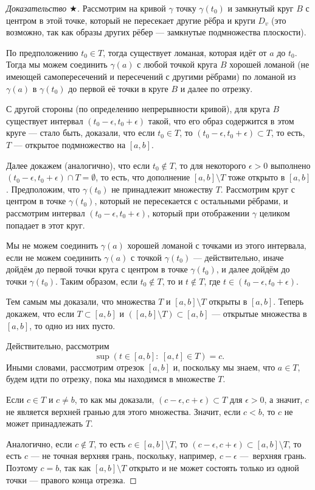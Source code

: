 \begin{proof}[Доказательство $\bigstar$]
    Рассмотрим на кривой $\gamma$ точку $\gamma(t_0)$ и замкнутый круг $B$ с центром в этой точке, который не пересекает другие рёбра и круги $D_v$ (это возможно, так как образы других рёбер — замкнутые подмножества плоскости).

    По предположению $t_0 \in T$, тогда существует ломаная, которая идёт от $a$ до $t_0$.
    Тогда мы можем соединить $\gamma(a)$ с любой точкой круга $B$ хорошей ломаной (не имеющей самопересечений и пересечений с другими рёбрами) по ломаной из $\gamma(a)$ в $\gamma(t_0)$ до первой её точки в круге $B$ и далее по отрезку.

    С другой стороны (по определению непрерывности кривой), для круга $B$ существует интервал $(t_0 - \epsilon, t_0 + \epsilon)$ такой, что его образ содержится в этом круге — стало быть, доказали, что если $t_0 \in T$, то $(t_0 - \epsilon, t_0 + \epsilon) \subset T$, то есть, $T$ — открытое подмножество на $[a,b]$.

    Далее докажем (аналогично), что если $t_0 \notin T$, то для некоторого $\epsilon > 0$ выполнено $(t_0 - \epsilon, t_0 + \epsilon) \cap T = \emptyset$, то есть, что дополнение $[a,b] \setminus T$ тоже открыто в $[a,b]$.
    Предположим, что $\gamma(t_0)$ не принадлежит множеству $T$.
    Рассмотрим круг с центром в точке $\gamma(t_0)$, который не пересекается с остальными рёбрами, и рассмотрим интервал $(t_0 - \epsilon, t_0 + \epsilon)$, который при отображении $\gamma$ целиком попадает в этот круг.

    Мы не можем соединить $\gamma(a)$ хорошей ломаной с точками из этого интервала, если не можем соединить $\gamma(a)$ с точкой $\gamma(t_0)$ — действительно, иначе дойдём до первой точки круга с центром в точке $\gamma(t_0)$, и далее дойдём до точки $\gamma(t_0)$.
    Таким образом, если $t_0 \notin T$, то и $t \notin T$, где $t \in (t_0 - \epsilon, t_0 + \epsilon)$.

    Тем самым мы доказали, что множества $T$ и $[a,b] \setminus T$ открыты в $[a,b]$.
    Теперь докажем, что если $T \subset [a,b]$ и $([a,b] \setminus T) \subset [a,b]$ — открытые множества в $[a,b]$, то одно из них пусто.

    Действительно, рассмотрим
    \[\sup(t \in [a,b]: \ [a,t] \in T) = c.\]
    Иными словами, рассмотрим отрезок $[a,b]$ и, поскольку мы знаем, что $a \in T$, будем идти по отрезку, пока мы находимся в множестве $T$.

    Если $c \in T$ и $c \neq b$, то как мы доказали, $(c - \epsilon, c + \epsilon) \subset T$ для $\epsilon > 0$, а значит, $c$ не является верхней гранью для этого множества. Значит, если $c < b$, то $c$ не может принадлежать $T$.

    Аналогично, если $c \notin T$, то есть $c \in [a,b] \setminus T$, то $(c - \epsilon, c + \epsilon) \subset [a,b] \setminus T$, то есть $c$ — не точная верхняя грань, поскольку, например, $c - \epsilon$ — верхняя грань.
    Поэтому $c = b$, так как $[a,b] \setminus T$ открыто и не может состоять только из одной точки — правого конца отрезка.

\end{proof}


